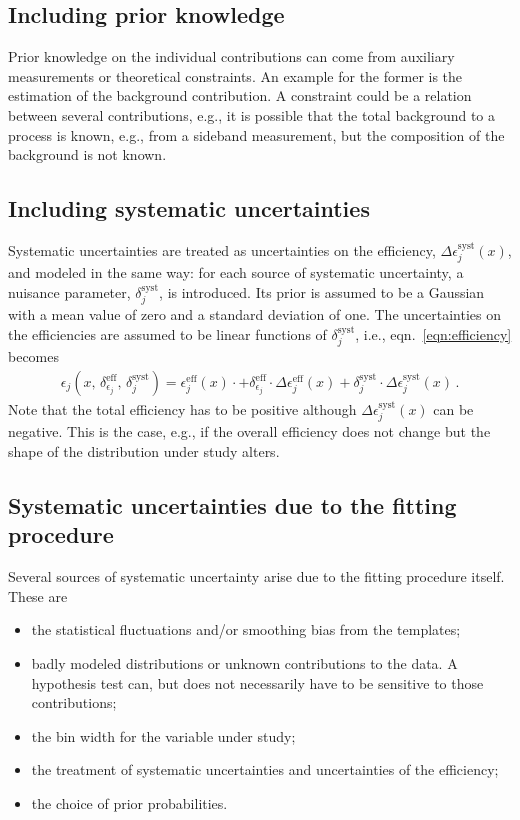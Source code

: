 \documentclass[11pt, a4paper]{article}
\begin{document}
\subsection{Including prior knowledge} 

Prior knowledge on the individual contributions can come from
auxiliary measurements or theoretical constraints. An example for the
former is the estimation of the background contribution. A constraint
could be a relation between several contributions, e.g., it is
possible that the total background to a process is known, e.g., from a
sideband measurement, but the composition of the background is not
known.

\subsection{Including systematic uncertainties}

Systematic uncertainties are treated as uncertainties on the
efficiency, $\Delta \epsilon_{j}^{\mathrm{syst}}(x)$, and modeled in
the same way: for each source of systematic uncertainty, a nuisance
parameter, $\delta_{j}^{\mathrm{syst}}$, is introduced. Its prior is
assumed to be a Gaussian with a mean value of zero and a standard
deviation of one. The uncertainties on the efficiencies are assumed to
be linear functions of $\delta_{j}^{\mathrm{syst}}$, i.e.,
eqn.~\ref{eqn:efficiency} becomes
%
\begin{eqnarray*}
\epsilon_{j}(x, \, \delta_{\epsilon_{j}}^{\mathrm{eff}}, \, \delta_{j}^{\mathrm{syst}}) = \epsilon_{j}^{\mathrm{eff}}(x) \cdot + \delta_{\epsilon_{j}}^{\mathrm{eff}} \cdot \Delta \epsilon_{j}^{\mathrm{eff}}(x) + \delta_{j}^{\mathrm{syst}} \cdot \Delta \epsilon_{j}^{\mathrm{syst}}(x) \, .
\label{eqn:syst}
\end{eqnarray*}
%
Note that the total efficiency has to be positive although $\Delta
\epsilon_{j}^{\mathrm{syst}}(x)$ can be negative. This is the case,
e.g., if the overall efficiency does not change but the shape of the
distribution under study alters.

\subsection{Systematic uncertainties due to the fitting procedure}

Several sources of systematic uncertainty arise due to the fitting
procedure itself. These are

\begin{itemize}
%
	\item the statistical fluctuations and/or smoothing bias from the
	templates; 
%
	\item badly modeled distributions or unknown contributions to the
	data. A hypothesis test can, but does not necessarily have to be
	sensitive to those contributions;
%
	\item the bin width for the variable under study;
%
  \item the treatment of systematic uncertainties and uncertainties of the efficiency;
%
	\item the choice of prior probabilities. 
%
\end{itemize}
\end{document}
